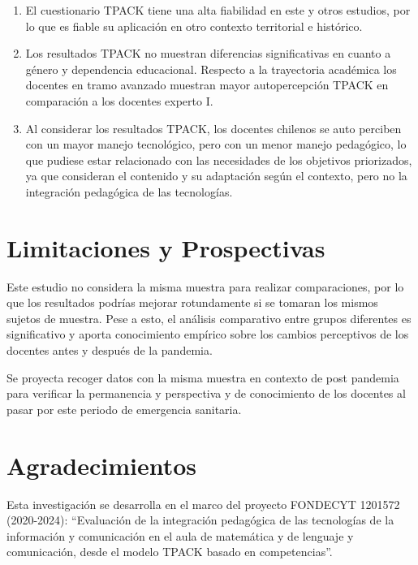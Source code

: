 \documentclass[spanish]{textolivre}
\begin{document}
\begin{enumerate}
    \item El cuestionario TPACK tiene una alta fiabilidad en este y otros estudios, por lo que es fiable su aplicación en otro contexto territorial e histórico.
    \item Los resultados TPACK no muestran diferencias significativas en cuanto a género y dependencia educacional. Respecto a la trayectoria académica los docentes en tramo avanzado muestran mayor autopercepción TPACK en comparación a los docentes experto I.
    \item Al considerar los resultados TPACK, los docentes chilenos se auto perciben con un mayor manejo tecnológico, pero con un menor manejo pedagógico, lo que pudiese estar relacionado con las necesidades de los objetivos priorizados, ya que consideran el contenido y su adaptación según el contexto, pero no la integración pedagógica de las tecnologías.
\end{enumerate}


\section{Limitaciones y Prospectivas}\label{sec-contributors-expl}
Este estudio no considera la misma muestra para realizar comparaciones, por lo que los resultados podrías mejorar rotundamente si se tomaran los mismos sujetos de muestra. Pese a esto, el análisis comparativo entre grupos diferentes es significativo y aporta conocimiento empírico sobre los cambios perceptivos de los docentes antes y después de la pandemia.

Se proyecta recoger datos con la misma muestra en contexto de post pandemia para verificar la permanencia y perspectiva y de conocimiento de los docentes al pasar por este periodo de emergencia sanitaria.

\section{Agradecimientos}\label{sec-conclusao}
Esta investigación se desarrolla en el marco del proyecto FONDECYT 1201572 (2020-2024): “Evaluación de la integración pedagógica de las tecnologías de la información y comunicación en el aula de matemática y de lenguaje y comunicación, desde el modelo TPACK basado en competencias”.


\printbibliography\label{sec-bib}
\end{document}
